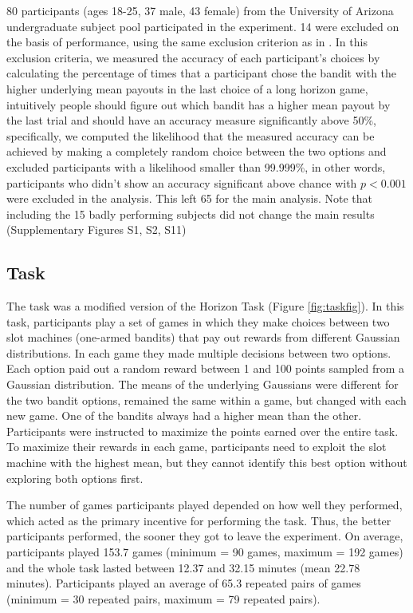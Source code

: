 \documentclass[12pt]{article}
\begin{document}
{80 participants (ages 18-25, 37 male, 43 female) from the University of Arizona undergraduate subject pool participated in the experiment. 14 were excluded on the basis of performance, using the same exclusion criterion as in \citep{wilson2014}. In this exclusion criteria, we measured the accuracy of each participant's choices by calculating the percentage of times that a participant chose the bandit with the higher underlying mean payouts in the last choice of a long horizon game, intuitively people should figure out which bandit has a higher mean payout by the last trial and should have an accuracy measure significantly above 50\%, specifically, we computed the likelihood that the measured accuracy can be achieved by making a completely random choice between the two options and excluded participants with a likelihood smaller than 99.999\%, in other words, participants who didn't show an accuracy significant above chance with $p < 0.001$ were excluded in the analysis. This left 65 for the main analysis. Note that including the 15 badly performing subjects did not change the main results (Supplementary Figures S1, S2, S11)

\subsection*{Task}
The task was a modified version of the Horizon Task \citep{wilson2014} (Figure \ref{fig:taskfig}). In this task, participants play a set of games in which they make choices between two slot machines (one-armed bandits) that pay out rewards from different Gaussian distributions. In each game they made multiple decisions between two options. Each option paid out a random reward between 1 and 100 points sampled from a Gaussian distribution. The means of the underlying Gaussians were different for the two bandit options, remained the same within a game, but changed with each new game. One of the bandits always had a higher mean than the other. Participants were instructed to maximize the points earned over the entire task. To maximize their rewards in each game, participants need to exploit the slot machine with the highest mean, but they cannot identify this best option without exploring both options first. 

The number of games participants played depended on how well they performed, which acted as the primary incentive for performing the task. Thus, the better participants performed, the sooner they got to leave the experiment. On average, participants played 153.7 games (minimum = 90 games, maximum = 192 games) and the whole task lasted between 12.37 and 32.15 minutes (mean 22.78 minutes). Participants played an average of 65.3 repeated pairs of games (minimum = 30 repeated pairs, maximum =  79 repeated pairs).

}
\end{document}
